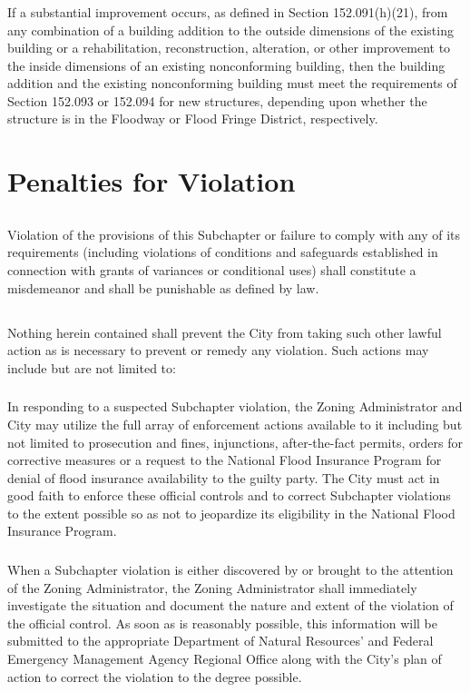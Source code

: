 \subsubsection{}
If a substantial improvement occurs, as defined in Section 152.091(h)(21), from any combination of a building addition to the outside dimensions of the existing building or a rehabilitation, reconstruction, alteration, or other improvement to the inside dimensions of an existing nonconforming building, then the building addition and the existing nonconforming building must meet the requirements of Section 152.093 or 152.094 for new structures, depending upon whether the structure is in the Floodway or Flood Fringe District, respectively.
\section{Penalties for Violation}
\subsection{}
Violation of the provisions of this Subchapter or failure to comply with any of its requirements (including violations of conditions and safeguards established in connection with grants of variances or conditional uses) shall constitute a misdemeanor and shall be punishable as defined by law.
\subsection{}
Nothing herein contained shall prevent the City from taking such other lawful action as is necessary to prevent or remedy any violation. Such actions may include but are not limited to:
\subsubsection{}
In responding to a suspected Subchapter violation, the Zoning Administrator and City may utilize the full array of enforcement actions available to it including but not limited to prosecution and fines, injunctions, after-the-fact permits, orders for corrective measures or a request to the National Flood Insurance Program for denial of flood insurance availability to the guilty party. The City must act in good faith to enforce these official controls and to correct Subchapter violations to the extent possible so as not to jeopardize its eligibility in the National Flood Insurance Program.
\subsubsection{}
When a Subchapter violation is either discovered by or brought to the attention of the Zoning Administrator, the Zoning Administrator shall immediately investigate the situation and document the nature and extent of the violation of the official control. As soon as is reasonably possible, this information will be submitted to the appropriate Department of Natural Resources' and Federal Emergency Management Agency Regional Office along with the City’s plan of action to correct the violation to the degree possible.
